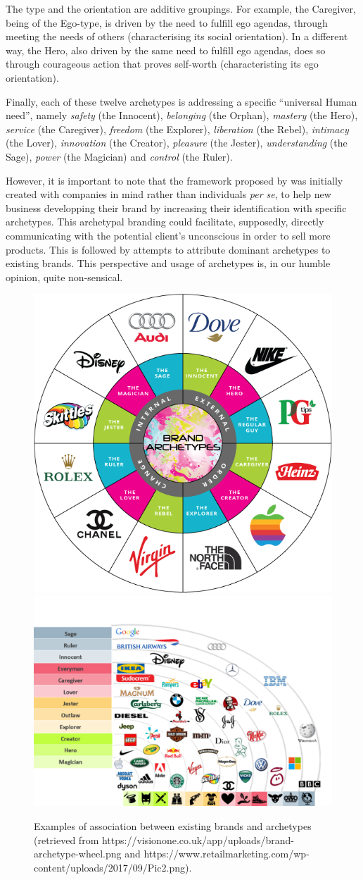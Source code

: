\documentclass[
]{book}
\begin{document}
The type and the orientation are additive groupings. For example, the Caregiver, being of the Ego-type, is driven by the need to fulfill ego agendas, through meeting the needs of others (characterising its social orientation). In a different way, the Hero, also driven by the same need to fulfill ego agendas, does so through courageous action that proves self-worth (characteristing its ego orientation).

Finally, each of these twelve archetypes is addressing a specific ``universal Human need'', namely \emph{safety} (the Innocent), \emph{belonging} (the Orphan), \emph{mastery} (the Hero), \emph{service} (the Caregiver), \emph{freedom} (the Explorer), \emph{liberation} (the Rebel), \emph{intimacy} (the Lover), \emph{innovation} (the Creator), \emph{pleasure} (the Jester), \emph{understanding} (the Sage), \emph{power} (the Magician) and \emph{control} (the Ruler).

However, it is important to note that the framework proposed by \citet{mark2001hero} was initially created with companies in mind rather than individuals \emph{per se}, to help new business developping their brand by increasing their identification with specific archetypes. This archetypal branding could facilitate, supposedly, directly communicating with the potential client's unconscious in order to sell more products. This is followed by attempts to attribute dominant archetypes to existing brands. This perspective and usage of archetypes is, in our humble opinion, quite non-sensical.

\begin{figure}

{\centering \includegraphics[width=0.49\linewidth]{img/brand_archetypes1} \includegraphics[width=0.49\linewidth]{img/brand_archetypes2} 

}

\caption{Examples of association between existing brands and archetypes (retrieved from https://visionone.co.uk/app/uploads/brand-archetype-wheel.png and https://www.retailmarketing.com/wp-content/uploads/2017/09/Pic2.png).}\label{fig:unnamed-chunk-10}
\end{figure}
\end{document}

